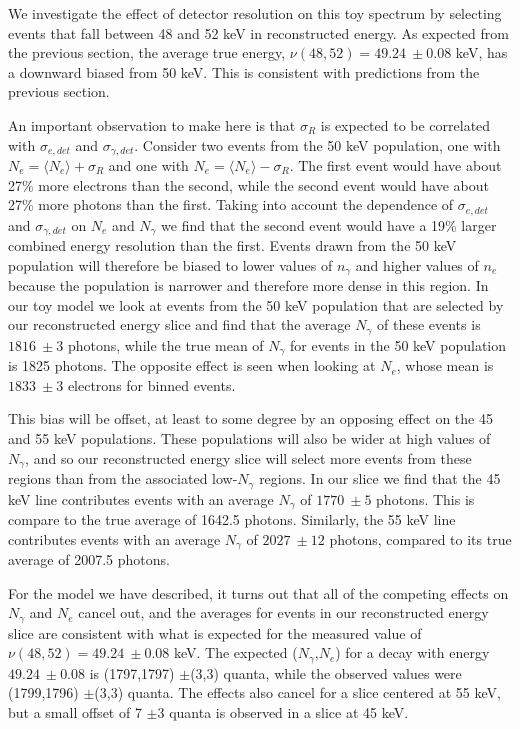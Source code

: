 We investigate the effect of detector resolution on this toy spectrum by selecting events that fall between 48 and 52 keV in reconstructed energy. As expected from the previous section, the average true energy, $\nu(48,52)=49.24 \ \pm 0.08$ keV, has a downward biased from 50 keV. This is consistent with predictions from the previous section. 

An important observation to make here is that $\sigma_R$ is expected to be correlated with $\sigma_{e,det}$ and $\sigma_{\gamma,det}$. Consider two events from the 50 keV population, one with $N_{e}=\langle N_{e} \rangle+\sigma_R$ and one with $N_{e}=\langle N_{e} \rangle-\sigma_R$. The first event would have about 27\% more electrons than the second, while the second event would have about 27\% more photons than the first. Taking into account the dependence of $\sigma_{e,det}$ and $\sigma_{\gamma,det}$ on $N_{e}$ and $N_{\gamma}$ we find that the second event would have a 19\% larger combined energy resolution than the first. Events drawn from the 50 keV population will therefore be biased to lower values of $n_{\gamma}$ and higher values of $n_e$ because the population is narrower and therefore more dense in this region. In our toy model we look at events from the 50 keV population that are selected by our reconstructed energy slice and find that the average $N_{\gamma}$ of these events is $1816 \ \pm3$ photons, while the true mean of $N_{\gamma}$ for events in the 50 keV population is 1825 photons. The opposite effect is seen when looking at $N_{e}$, whose mean is $1833 \ \pm3$ electrons for binned events. 

This bias will be offset, at least to some degree by an opposing effect on the 45 and 55 keV populations. These populations will also be wider at high values of $N_{\gamma}$, and so our reconstructed energy slice will select more events from these regions than from the associated low-$N_{\gamma}$ regions. In our slice we find that the 45 keV line contributes events with an average $N_{\gamma}$ of $1770 \ \pm5$ photons. This is compare to the true average of 1642.5 photons. Similarly, the 55 keV line contributes events with an average $N_{\gamma}$ of $2027 \ \pm12$ photons, compared to its true average of 2007.5 photons.

For the model we have described, it turns out that all of the competing effects on $N_{\gamma}$ and $N_{e}$ cancel out, and the averages for events in our reconstructed energy slice are consistent with what is expected for the measured value of $\nu(48,52)=49.24 \ \pm 0.08$ keV. The expected ($N_{\gamma}$,$N_{e}$) for a decay with energy $49.24 \ \pm 0.08$ is (1797,1797) $\pm$(3,3) quanta, while the observed values were (1799,1796) $\pm$(3,3) quanta. The effects also cancel for a slice centered at 55 keV, but a small offset of 7 $\pm$3 quanta is observed in a slice at 45 keV. 

